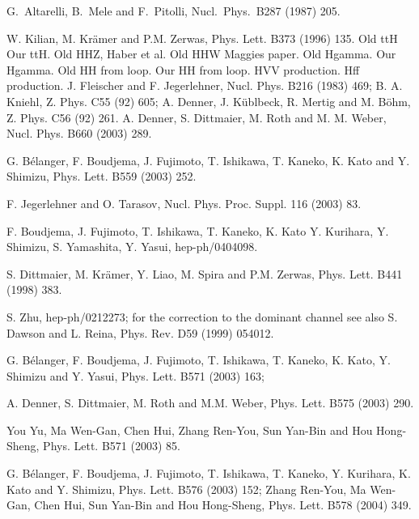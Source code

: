 G.\ Altarelli, B.\ Mele and F.\ Pitolli, Nucl.\ Phys.\ B287 (1987) 205.

 W. Kilian, M. Kr\"amer and P.M. Zerwas, Phys. Lett. B373 
(1996) 135.
%
 Old ttH
%
 Our ttH. 
%
 Old HHZ, Haber et al. 
% 
 Old HHW
%
 Maggies paper.
%
 Old Hgamma.
%
 Our Hgamma.
%
 Old HH from loop.
%
 Our HH from loop. 
%
 HVV production.
%
 Hff production.
%
%
%
%
%
%
%
J. Fleischer and F. Jegerlehner, Nucl. Phys. B216 (1983) 469;
B. A. Kniehl, Z. Phys. C55 (92) 605;
A. Denner, J. K\"ublbeck, R. Mertig and M. B\"ohm, Z. Phys. C56 (92) 261.
%
A. Denner, S. Dittmaier, M. Roth and M. M. Weber, Nucl. Phys. B660 (2003) 289.

G. B\'elanger, F. Boudjema, J. Fujimoto, T. Ishikawa, T. Kaneko, 
K. Kato and Y. Shimizu, Phys. Lett. B559 (2003) 252. 

 F. Jegerlehner and O. Tarasov, Nucl. Phys. Proc. Suppl. 116 
(2003) 83.  

 F. Boudjema, J. Fujimoto, T. Ishikawa, T. Kaneko, K. Kato
Y. Kurihara, Y. Shimizu, S. Yamashita, Y. Yasui, hep-ph/0404098. 

 S. Dittmaier, M. Kr\"amer, Y. Liao, M. Spira and P.M. Zerwas,
Phys. Lett. B441 (1998) 383. 

 S. Zhu, hep-ph/0212273;  for the correction to the dominant
channel see also S. Dawson and L. Reina,  Phys. Rev. D59 (1999) 054012.

 G. B\'elanger, F. Boudjema, J. Fujimoto, T. Ishikawa, 
T. Kaneko, K. Kato, Y. Shimizu and Y. Yasui, Phys. Lett. B571 (2003) 163; 

A. Denner, S. Dittmaier, M. Roth and  M.M. Weber, Phys. Lett. B575 (2003) 290.

You Yu, Ma Wen-Gan, Chen Hui, Zhang Ren-You, Sun Yan-Bin and Hou Hong-Sheng,
Phys. Lett. B571 (2003) 85.

  G. B\'elanger, F. Boudjema, J. Fujimoto, T. Ishikawa, 
T. Kaneko, Y. Kurihara, K. Kato and Y. Shimizu, Phys. Lett. B576 (2003) 152;
Zhang Ren-You, Ma Wen-Gan, Chen Hui, Sun Yan-Bin and Hou Hong-Sheng,
Phys. Lett. B578 (2004) 349.

